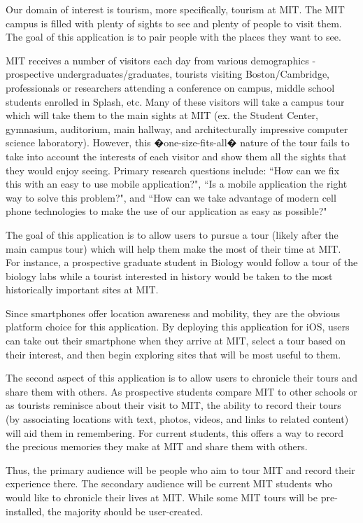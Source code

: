 \documentclass{sigchi}
\begin{document}
Our domain of interest is tourism, more specifically, tourism at MIT. The MIT campus is filled with plenty of sights to see and plenty of people to visit them. The goal of this application is to pair people with the places they want to see.

MIT receives a number of visitors each day from various demographics - prospective undergraduates/graduates, tourists visiting Boston/Cambridge, professionals or researchers attending a conference on campus, middle school students enrolled in Splash, etc. Many of these visitors will take a campus tour which will take them to the main sights at MIT (ex. the Student Center, gymnasium, auditorium, main hallway, and architecturally impressive computer science laboratory). However, this �one-size-fits-all� nature of the tour fails to take into account the interests of each visitor and show them all the sights that they would enjoy seeing. Primary research questions include: ``How can we fix this with an easy to use mobile application?", ``Is a mobile application the right way to solve this problem?", and ``How can we take advantage of modern cell phone technologies to make the use of our application as easy as possible?"

The goal of this application is to allow users to pursue a tour (likely after the main campus tour) which will help them make the most of their time at MIT. For instance, a prospective graduate student in Biology would follow a tour of the biology labs while a tourist interested in history would be taken to the most historically important sites at MIT. 

Since smartphones offer location awareness and mobility, they are the obvious platform choice for this application. By deploying this application for iOS, users can take out their smartphone when they arrive at MIT, select a tour based on their interest, and then begin exploring sites that will be most useful to them. 

The second aspect of this application is to allow users to chronicle their tours and share them with others. As prospective students compare MIT to other schools or as tourists reminisce about their visit to MIT, the ability to record their tours (by associating locations with text, photos, videos, and links to related content) will aid them in remembering. For current students, this offers a way to record the precious memories they make at MIT and share them with others.

Thus, the primary audience will be people who aim to tour MIT and record their experience there. The secondary audience will be current MIT students who would like to chronicle their lives at MIT. While some MIT tours will be pre-installed, the majority should be user-created. 
\end{document}

